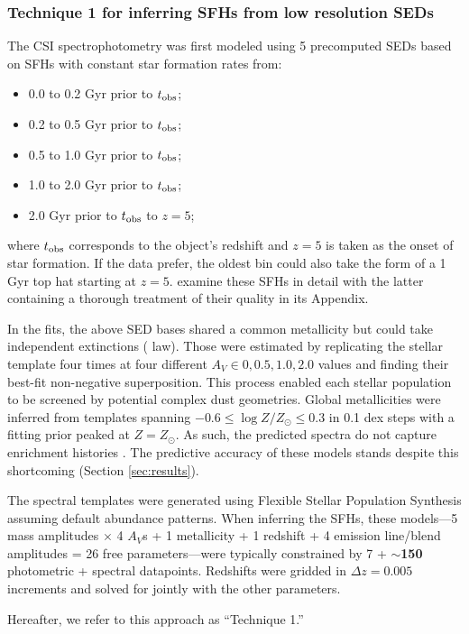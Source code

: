 \documentclass[a4paper,fleqn,usenatbib]{mnras}
\newcommand{\logZ}{\log Z/Z_{\odot}}
\newcommand{\bfr}{\bf\color{red}}
\newcommand{\tobs}{t_{\rm obs}}
\newcommand{\bitem}{\begin{itemize}}
\newcommand{\eitem}{\end{itemize}}
\begin{document}
\subsubsection{Technique 1 for inferring SFHs from low resolution SEDs}
\label{sec:blocks}

The CSI spectrophotometry was first modeled using 5 precomputed SEDs based on SFHs with 
constant star formation rates from:
\bitem
	\item 0.0 to 0.2 Gyr prior to $\tobs$;
	\item 0.2 to 0.5 Gyr prior to $\tobs$;
	\item 0.5 to 1.0 Gyr prior to $\tobs$;
	\item 1.0 to 2.0 Gyr prior to $\tobs$;
	\item 2.0 Gyr prior to $\tobs$ to $z=5$;
\eitem
where $\tobs$ corresponds to the object's redshift and $z=5$ is taken as the onset of star formation. If 
the data prefer, the oldest bin could also take the form of a 1 Gyr top hat starting at $z=5$. 
\citet{Dressler16, Dressler18} examine these SFHs in detail with the latter containing a thorough 
treatment of their quality in its Appendix.

In the fits, the above SED bases shared a common metallicity but could take independent extinctions 
(\citealt{Calzetti00} law). Those were estimated by replicating the stellar template four times
at four different {\bfr $A_{V}\in{0,0.5,1.0,2.0}$} values and finding their best-fit non-negative
superposition. This process enabled each stellar population to be screened by potential complex dust
geometries. Global metallicities were inferred from templates spanning 
$-0.6\leq\logZ\leq0.3$ in 0.1 dex steps with a fitting prior peaked at $Z=Z_{\odot}$. 
As such, the predicted spectra do not capture enrichment 
histories \citep[cf.][]{Pacifici12, Morishita19}. The predictive accuracy of these models stands despite 
this shortcoming (Section \ref{sec:results}).

The spectral templates were generated using Flexible Stellar Population Synthesis 
\citep[FSPS;][]{ConroyGunnWhite09} assuming default abundance patterns. When inferring the SFHs, 
these models---5 mass amplitudes $\times$ 4 $A_{V}$s + 1 metallicity + 1 redshift + 4 emission line/blend 
amplitudes = 26 free parameters---were typically constrained by 
7 + {\bfr $\sim$150} photometric + spectral datapoints. Redshifts were gridded in $\Delta z = 0.005$ 
increments and solved for jointly with the other parameters.

Hereafter, we refer to this approach as ``Technique 1.''
\end{document}
